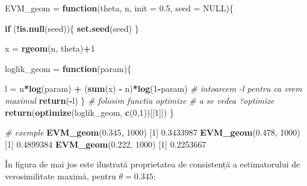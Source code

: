 \documentclass[]{article}
\newenvironment{Shaded}{\begin{snugshade}}{\end{snugshade}}
\newcommand{\KeywordTok}[1]{\textcolor[rgb]{0.13,0.29,0.53}{\textbf{#1}}}
\newcommand{\DataTypeTok}[1]{\textcolor[rgb]{0.13,0.29,0.53}{#1}}
\newcommand{\DecValTok}[1]{\textcolor[rgb]{0.00,0.00,0.81}{#1}}
\newcommand{\FloatTok}[1]{\textcolor[rgb]{0.00,0.00,0.81}{#1}}
\newcommand{\StringTok}[1]{\textcolor[rgb]{0.31,0.60,0.02}{#1}}
\newcommand{\CommentTok}[1]{\textcolor[rgb]{0.56,0.35,0.01}{\textit{#1}}}
\newcommand{\OtherTok}[1]{\textcolor[rgb]{0.56,0.35,0.01}{#1}}
\newcommand{\ControlFlowTok}[1]{\textcolor[rgb]{0.13,0.29,0.53}{\textbf{#1}}}
\newcommand{\OperatorTok}[1]{\textcolor[rgb]{0.81,0.36,0.00}{\textbf{#1}}}
\newcommand{\NormalTok}[1]{#1}
\begin{document}
\begin{Shaded}
\begin{Highlighting}[]
\NormalTok{EVM_geom =}\StringTok{ }\ControlFlowTok{function}\NormalTok{(theta, n, }\DataTypeTok{init =} \FloatTok{0.5}\NormalTok{, }\DataTypeTok{seed =} \OtherTok{NULL}\NormalTok{)\{}
  
  \ControlFlowTok{if}\NormalTok{ (}\OperatorTok{!}\KeywordTok{is.null}\NormalTok{(seed))\{}
    \KeywordTok{set.seed}\NormalTok{(seed)}
\NormalTok{  \}}
  
\NormalTok{  x =}\StringTok{ }\KeywordTok{rgeom}\NormalTok{(n, theta)}\OperatorTok{+}\DecValTok{1}
  
\NormalTok{  loglik_geom =}\StringTok{ }\ControlFlowTok{function}\NormalTok{(param)\{}
    
\NormalTok{    l =}\StringTok{ }\NormalTok{n}\OperatorTok{*}\KeywordTok{log}\NormalTok{(param) }\OperatorTok{+}\StringTok{ }\NormalTok{(}\KeywordTok{sum}\NormalTok{(x) }\OperatorTok{-}\StringTok{ }\NormalTok{n)}\OperatorTok{*}\KeywordTok{log}\NormalTok{(}\DecValTok{1}\OperatorTok{-}\NormalTok{param)}
    \CommentTok{# intoarcem -l pentru ca vrem maximul}
    \KeywordTok{return}\NormalTok{(}\OperatorTok{-}\NormalTok{l)}
\NormalTok{  \}}
  \CommentTok{# folosim functia optimize}
  \CommentTok{# a se vedea ?optimize}
  \KeywordTok{return}\NormalTok{(}\KeywordTok{optimize}\NormalTok{(loglik_geom, }\KeywordTok{c}\NormalTok{(}\DecValTok{0}\NormalTok{,}\DecValTok{1}\NormalTok{))[[}\DecValTok{1}\NormalTok{]])}
\NormalTok{\}}

\CommentTok{# exemple}
\KeywordTok{EVM_geom}\NormalTok{(}\FloatTok{0.345}\NormalTok{, }\DecValTok{1000}\NormalTok{)}
\NormalTok{[}\DecValTok{1}\NormalTok{] }\FloatTok{0.3433987}
\KeywordTok{EVM_geom}\NormalTok{(}\FloatTok{0.478}\NormalTok{, }\DecValTok{1000}\NormalTok{)}
\NormalTok{[}\DecValTok{1}\NormalTok{] }\FloatTok{0.4899384}
\KeywordTok{EVM_geom}\NormalTok{(}\FloatTok{0.222}\NormalTok{, }\DecValTok{1000}\NormalTok{)}
\NormalTok{[}\DecValTok{1}\NormalTok{] }\FloatTok{0.2253667}
\end{Highlighting}
\end{Shaded}

În figura de mai jos este ilustrată proprietatea de consistență a
estimatorului de verosimilitate maximă, pentru \(\theta = 0.345\):
\end{document}
